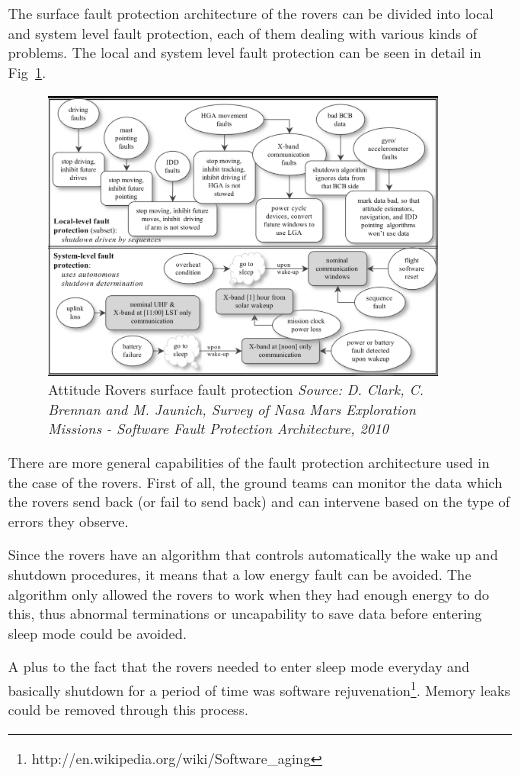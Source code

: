 The surface fault protection architecture of the rovers can be divided into
local and system level fault protection, each of them dealing with various kinds of
problems. The local and system level fault protection can be seen in detail in
Fig~\ref{fig:rovers}.
\cite{fprot}

\begin{figure}[htb]
	\begin{center}
	\includegraphics[width=0.92\textwidth]{img/rovers.png}
	\caption{Attitude Rovers surface fault protection\small{\textit{ Source: D.
	Clark, C. Brennan and M. Jaunich, Survey of Nasa Mars Exploration Missions -
	Software Fault Protection Architecture, 2010}}}
	\label{fig:rovers}
	\end{center}
\end{figure}

There are more general capabilities of the fault protection architecture used in
the case of the rovers. First of all, the ground teams can monitor the data
which the rovers send back (or fail to send back) and can intervene based on the
type of errors they observe.

Since the rovers have an algorithm that controls automatically the wake up and
shutdown procedures, it means that a low energy fault can be avoided. The
algorithm only allowed the rovers to work when they had enough energy to do
this, thus abnormal terminations or uncapability to save data before entering
sleep mode could be avoided. 

A plus to the fact that the rovers needed to enter sleep mode everyday and
basically shutdown for a period of time was software
rejuvenation\footnote{http://en.wikipedia.org/wiki/Software\_aging}. Memory
leaks could be removed through this process.

